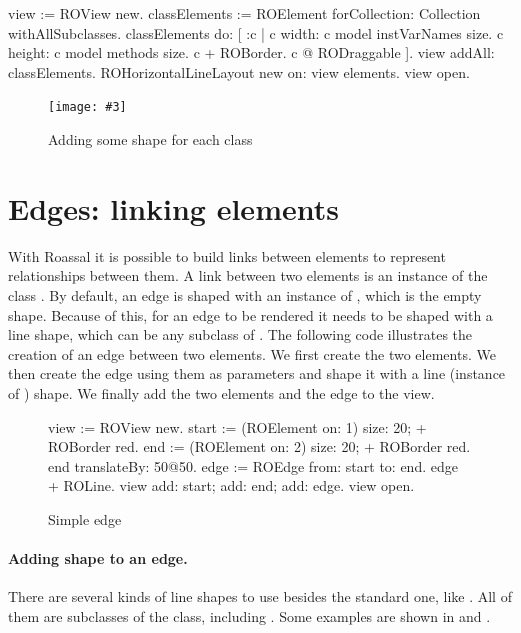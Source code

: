 \documentclass[a4paper,10pt,twoside]{book}
\newcommand{\fig}[4]{
		\begin{figure}[#1]
			\centering
			\texttt{[image: \#3]}
			\caption{\label{fig:#3}#4}
		\end{figure}}
\begin{document}
\begin{code}{}
view := ROView new.
classElements := ROElement forCollection: Collection withAllSubclasses.
classElements do: [ :c | 
	c width: c model instVarNames size.
	c height: c model methods size.
	c + ROBorder. 
	c @ RODraggable ].
view addAll: classElements.
ROHorizontalLineLayout new on: view elements.
view open.
\end{code}

\fig{H}{0.6}{hier2}{Adding some shape for each class}


\section{Edges: linking elements} 

With Roassal it is possible to build links between elements to represent relationships between them. A link between two elements is an instance of the class . 
By default, an edge is shaped with an instance of , which is the empty shape. Because of this, for an edge to be rendered it needs to be shaped with a line shape, which can be any subclass of .
The following code illustrates the creation of an edge between two elements. We first create the two elements. We then create the edge using them as parameters and shape it with a line (instance of ) shape. We finally add the two elements and the edge to the view.

\begin{figure}[H]
 \begin{code}{}
view := ROView new.
start := (ROElement on: 1) size: 20; + ROBorder red.
end := (ROElement on: 2)  size: 20; + ROBorder red.
end translateBy: 50@50.
edge := ROEdge from: start to: end.
edge + ROLine. 
view 
	add: start; 
	add: end; 
	add: edge. 
view open.
\end{code}   
\caption{Simple edge}
\label{fig:simpleEdge}
\end{figure} 

\paragraph{Adding shape to an edge.}
There are several kinds of line shapes to use besides the standard one, like . All of them are subclasses of the  class, including . 
Some examples are shown in  and .
\end{document}
